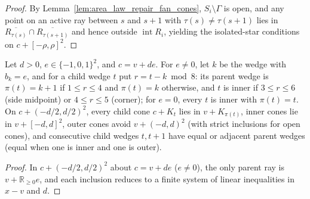 \begin{proof}
    \leanok
    By Lemma~\ref{lem:area_law_repair_fan_cones}, $S_i\setminus\Gamma$ is open, and any point on an
    active ray between $s$ and $s+1$ with $\tau(s)\ne\tau(s+1)$ lies in $\overline{R_{\tau(s)}}\cap\overline{R_{\tau(s+1)}}$
    and hence outside $\operatorname{int}R_i$, yielding the isolated-star conditions on $c+[-\rho,\rho]^2$.
\end{proof}

\begin{lemma}
    \label{lem:area_law_repair_child_cones}
    \leanok
    Let $d>0$, $e\in\{-1,0,1\}^2$, and $c=v+de$. For $e\ne0$, let $k$ be the wedge with $b_k=e$,
    and for a child wedge $t$ put $r=t-k\bmod8$: its parent wedge is $\pi(t)=k+1$ if $1\le r\le4$
    and $\pi(t)=k$ otherwise, and $t$ is inner if $3\le r\le6$ (side midpoint) or $4\le r\le5$
    (corner); for $e=0$, every $t$ is inner with $\pi(t)=t$. On $c+(-d/2,d/2)^2$, every child cone
    $c+K_t$ lies in $v+K_{\pi(t)}$, inner cones lie in $v+[-d,d]^2$, outer cones avoid $v+(-d,d)^2$
    (with strict inclusions for open cones), and consecutive child wedges $t,t+1$ have equal or
    adjacent parent wedges (equal when one is inner and one is outer).
\end{lemma}

\begin{proof}
    \leanok
    In $c+(-d/2,d/2)^2$ about $c=v+de$ ($e\ne0$), the only parent ray is $v+\mathbb R_{\ge0}e$,
    and each inclusion reduces to a finite system of linear inequalities in $x-v$ and $d$.
\end{proof}

